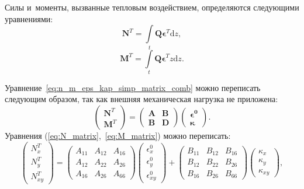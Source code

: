 Силы и~моменты, вызванные тепловым воздействием, определяются следующими уравнениями:
\begin{equation}\label{eq:NT_integral}
\mathbf{N}^T = \int\limits_t \mathbf{Q} \boldsymbol{\epsilon}^T \mathrm{d}z,
\end{equation}
\begin{equation}\label{eq:MT_integral}
\mathbf{M}^T = \int\limits_t \mathbf{Q} \boldsymbol{\epsilon}^T z \mathrm{d}z.
\end{equation}

Уравнение~\eqref{eq:n_m_eps_kap_simp_matrix_comb} можно переписать следующим
образом, так как внешняя механическая нагрузка не приложена:
\[
\left(
    \begin{array}{c}
        \mathbf{N}^T \\
        \mathbf{M}^T
    \end{array}
\right)
=
\left(
    \begin{array}{cc}
        \mathbf{A} & \mathbf{B} \\
        \mathbf{B} & \mathbf{D}
    \end{array}
\right)
\left(
    \begin{array}{c}
        \boldsymbol{\epsilon^0} \\
        \boldsymbol{\kappa}
    \end{array}
\right)\!\!.
\]
Уравнения (\ref{eq:N_matrix},~\ref{eq:M_matrix}) можно переписать: %
\[
    \begin{pmatrix}
    N_{x}^T\\
    N_{y}^T\\
    N_{xy}^T
    \end{pmatrix}
    =
    \begin{pmatrix}
    A_{11} & A_{12} & A_{16}\\
    A_{12} & A_{22} & A_{26}\\
    A_{16} & A_{26} & A_{66}
    \end{pmatrix}
    \begin{pmatrix}
    \epsilon_{x}^0\\
    \epsilon_{y}^0\\
    \epsilon_{xy}^0
    \end{pmatrix}
    +
    \begin{pmatrix}
    B_{11} & B_{12} & B_{16}\\
    B_{12} & B_{22} & B_{26}\\
    B_{16} & B_{26} & B_{66}
    \end{pmatrix}
    \begin{pmatrix}
    \kappa_{x}\\
    \kappa_{y}\\
    \kappa_{xy}
    \end{pmatrix}\!\!,
\]
